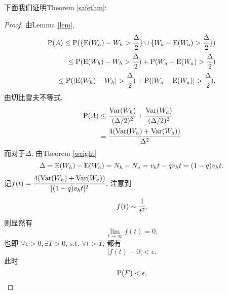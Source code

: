 \documentclass[UTF8]{ctexart}
\theoremstyle{definition}
\theoremstyle{plain}
\begin{document}
下面我们证明Theorem \ref{safethm}:
\begin{proof}
    由Lemma \ref{lem},
    \begin{align*}
        {\rm P}(A) \le {\rm P}(\{{\rm E}(W_h)-W_h>\cfrac{\Delta}{2}\} \cup \{W_a-{\rm E}(W_a)>\cfrac{\Delta}{2}\}) \\ \le 
    {\rm P}({\rm E}(W_h)-W_h>\cfrac{\Delta}{2})+{\rm P}(W_a-{\rm E}(W_a)>\cfrac{\Delta}{2}) \\ 
    \le {\rm P}(|{\rm E}(W_h)-W_h|>\cfrac{\Delta}{2})+{\rm P}(|W_a-{\rm E}(W_a)|>\cfrac{\Delta}{2}).
    \end{align*}
    由切比雪夫不等式, 
    \begin{align*}
        {\rm P}(A) &\le \cfrac{{\rm Var}(W_h)}{(\Delta/2)^2} + \cfrac{{\rm Var}(W_a)}{(\Delta/2)^2} \\ 
        &=  \cfrac{4({\rm Var}(W_h)+{\rm Var}(W_a))}{\Delta^2}
    \end{align*}
    而对于$\Delta$, 由Theorem \ref{weight}
    \[\Delta = {\rm E}(W_h)-{\rm E}(W_a) = N_h - N_a = v_ht-qv_ht=(1-q)v_ht.\]
    记$f(t) = \cfrac{4({\rm Var}(W_h)+{\rm Var}(W_a))}{[(1-q)v_ht]^2}$, 
    注意到
    \[f(t) \sim \cfrac{1}{t^2},\]
    则显然有
    \[\lim_{t\rightarrow \infty}f(t) = 0.\]
    也即
    $\forall \epsilon>0, \exists T>0$, s.t. $\forall t>T$, 都有
    \[|f(t)-0|<\epsilon.\]
    此时
    \[{\rm P}(F) < \epsilon,\]
\end{proof}








\end{document}
